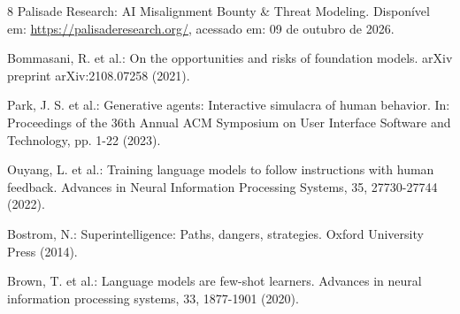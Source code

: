 \documentclass[runningheads]{llncs}
\begin{document}
\begin{thebibliography}{8}
Palisade Research: AI Misalignment Bounty \& Threat Modeling. Disponível em: \url{https://palisaderesearch.org/}, acessado em: 09 de outubro de 2026.

Bommasani, R. et al.: On the opportunities and risks of foundation models. arXiv preprint arXiv:2108.07258 (2021).

Park, J. S. et al.: Generative agents: Interactive simulacra of human behavior. In: Proceedings of the 36th Annual ACM Symposium on User Interface Software and Technology, pp. 1-22 (2023).

Ouyang, L. et al.: Training language models to follow instructions with human feedback. Advances in Neural Information Processing Systems, 35, 27730-27744 (2022).

Bostrom, N.: Superintelligence: Paths, dangers, strategies. Oxford University Press (2014).

Brown, T. et al.: Language models are few-shot learners. Advances in neural information processing systems, 33, 1877-1901 (2020).
\end{thebibliography}
\end{document}
